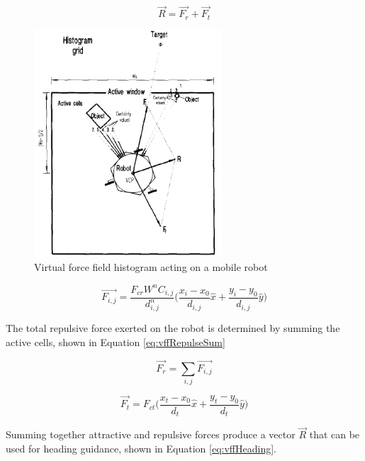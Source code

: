 \documentclass[numbered,pdftex]{ohio-etd}
\begin{document}
\begin{equation}\label{eq:vffHeading}
\overrightarrow{R} = \overrightarrow{F_r} + \overrightarrow{F_t}
\end{equation} 



\begin{figure}[H]
	\centering
	\includegraphics[width=7cm]{PaperFigures/histogram}
	\caption{Virtual force field histogram acting on a mobile robot \cite{borenstein_vector_1991}}
	\label{fig:histogram}
\end{figure}

\begin{equation}\label{eq:vffRepulse}
\overrightarrow{F_{i,j}} = \frac{F_{cr}W^nC_{i,j}}{d^n_{i,j}} \bigg( \frac{x_i-x_0}{d_{i,j}}\hat{x} + \frac{y_i-y_0}{d_{i,j}}\hat{y}\bigg)
\end{equation}

\noindent
The total repulsive force exerted on the robot is determined by summing the active cells, shown in Equation \ref{eq:vffRepulseSum}


\begin{equation}\label{eq:vffRepulseSum}
\overrightarrow{F_r} = \sum_{i,j}\overrightarrow{F_{i,j}}
\end{equation}


\begin{equation}\label{eq:vffGoal}
\overrightarrow{F_t} = F_{ct} \bigg( \frac{x_t-x_0}{d_{t}}\hat{x} + \frac{y_t-y_0}{d_{t}}\hat{y}\bigg)
\end{equation}

\noindent
Summing together attractive and repulsive forces produce a vector $\overrightarrow{R}$ that can be used for heading guidance, shown in Equation \ref{eq:vffHeading}.
\end{document}
